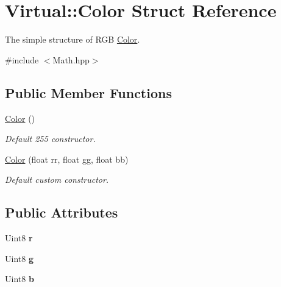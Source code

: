 \hypertarget{struct_virtual_1_1_color}{}\section{Virtual\+:\+:Color Struct Reference}
\label{struct_virtual_1_1_color}


The simple structure of R\+GB \hyperlink{struct_virtual_1_1_color}{Color}.  




{\ttfamily \#include $<$Math.\+hpp$>$}

\subsection*{Public Member Functions}
\begin{DoxyCompactItemize}
\item 
\hyperlink{struct_virtual_1_1_color_a003277f5a30952ecccedbb61ad347ddc}{Color} ()
\begin{DoxyCompactList}\small\item\em Default 255 constructor. \end{DoxyCompactList}\item 
\hyperlink{struct_virtual_1_1_color_a04237a9e45fdf6378288d5b93573ace7}{Color} (float rr, float gg, float bb)
\begin{DoxyCompactList}\small\item\em Default custom constructor. \end{DoxyCompactList}\end{DoxyCompactItemize}
\subsection*{Public Attributes}
\begin{DoxyCompactItemize}
\item 
\hypertarget{struct_virtual_1_1_color_afc2067553aabb70f0b84a8e36793f1a1}{}\label{struct_virtual_1_1_color_afc2067553aabb70f0b84a8e36793f1a1} 
Uint8 {\bfseries r}
\item 
\hypertarget{struct_virtual_1_1_color_a2966b2965d8be251c3c9d0f4f428f857}{}\label{struct_virtual_1_1_color_a2966b2965d8be251c3c9d0f4f428f857} 
Uint8 {\bfseries g}
\item 
\hypertarget{struct_virtual_1_1_color_a3aaa995ed8089d50d039783f7e6c8b03}{}\label{struct_virtual_1_1_color_a3aaa995ed8089d50d039783f7e6c8b03} 
Uint8 {\bfseries b}
\end{DoxyCompactItemize}


